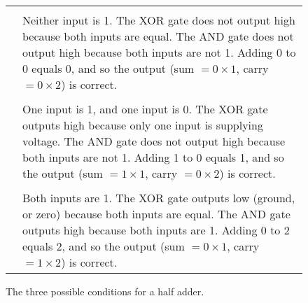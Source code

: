\begin{figure}[ht!]
\begin{center}

\begin{tabular}{m{3.2in} m{2.5in}}
\hline\\[\negsep]
 & 
Neither input is 1. The XOR gate does not output high because both inputs are equal. The AND gate does not output high because both inputs are not 1. Adding 0 to 0 equals 0, and so the output (sum $ = 0 \times 1$, carry $ = 0 \times 2$) is correct.\\[\sep]
\hline\\[\negsep]

 &  
One input is 1, and one input is 0. The XOR gate outputs high because only one input is supplying voltage. The AND gate does not output high because both inputs are not 1. Adding 1 to 0 equals 1, and so the output (sum $ = 1 \times 1$, carry $ = 0 \times 2$) is correct.\\[\sep]
\hline\\[\negsep]

 &  
Both inputs are 1. The XOR gate outputs low (ground, or zero) because both inputs are equal. The AND gate outputs high because both inputs are 1. Adding 0 to 2 equals 2, and so the output (sum $ = 0 \times 1$, carry $ = 1 \times 2$) is correct.\\[\sep]
\hline
\end{tabular}

\caption{The three possible conditions for a half adder.}
\label{fig:threehalfadders}
\end{center}
\end{figure}
